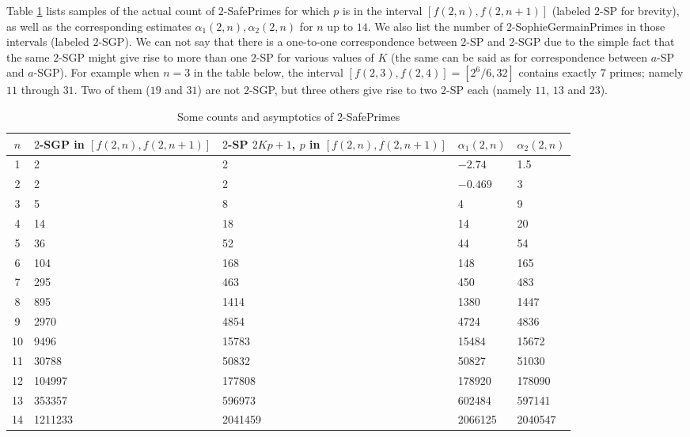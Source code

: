 \documentclass{amsart}
\numberwithin{equation}{section}
\begin{document}
Table \ref{gsp} lists  samples of the actual count of $2$-SafePrimes for which $p$ is in the interval $[f(2,n), f(2,n+1)]$ (labeled $2$-SP for brevity), as well as the corresponding estimates $\alpha_1(2,n), \alpha_2(2,n)$ for $n$ up to $14$. We also list the number of $2$-SophieGermainPrimes in those intervals (labeled $2$-SGP).  
We can not say that there is a one-to-one correspondence between $2$-SP and $2$-SGP due to the simple fact that the same $2$-SGP might give rise to more than one $2$-SP for various values of $K$ (the same can be said as for correspondence between $a$-SP and $a$-SGP). For example when $n=3$ in the table below, the interval $[f(2,3), f(2,4)]=[2^6/6, 32]$ contains exactly $7$ primes; namely $11$ through $31$. Two of them ($19$ and $31$) are not $2$-SGP, but three others give rise to two $2$-SP each (namely $11$, $13$ and $23$).

\begin{table}[h]
	\centering
	
	\begin{tabularx}{\linewidth}{|c|X|X|X|X|}
		\hline
		$n$  & $2$-SGP in  $[f(2,n), f(2,n+1)]$ & $2$-SP $2Kp+1$, $p$ in $[f(2,n), f(2,n+1)]$ & $\alpha_1(2,n)$ & $\alpha_2(2,n)$ \\
		\hline
		1 & 2 & 2 & $-2.74$ & 1.5 \\
		\hline 
		2 & 2 & 2 & $-0.469$ & 3 \\
		\hline
		3 & 5 & 8 & 4 & 9 \\
		\hline
		4 & 14 & 18 & 14 & 20 \\
		\hline
		5 & 36 & 52 & 44 & 54 \\
		\hline 
		6 & 104 & 168 & 148 & 165 \\ 
		\hline
		7 & 295 & 463 & 450 & 483 \\
		\hline
		8 & 895 & 1414 & 1380 & 1447 \\
		\hline
		9 & 2970 & 4854 & 4724 & 4836 \\
		\hline
		10 & 9496 & 15783 & 15484 & 15672 \\
		\hline
		11 & 30788 & 50832 & 50827 & 51030 \\
		\hline
		12 & 104997 & 177808 & 178920 & 178090 \\
		\hline
		13 & 353357 & 596973 & 602484 & 597141 \\
		\hline
		14 & 1211233 & 2041459 & 2066125 & 2040547 \\
		\hline
	\end{tabularx}
	\caption{Some counts and asymptotics of $2$-SafePrimes} \label{gsp}       
\end{table}
\end{document}
